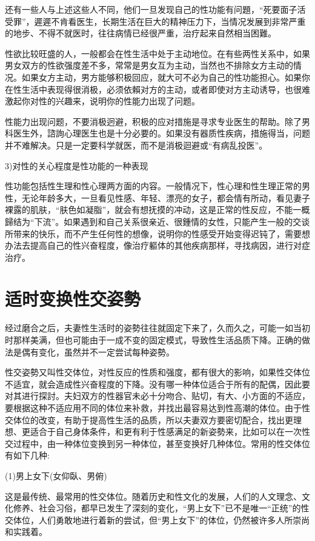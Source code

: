\documentclass[12pt,UTF8]{ctexbook}
\begin{document}
还有一些人与上述这些人不同，他们一旦发现自己的性功能有问題，“死要面子活受罪”，遲遲不肯看医生，长期生活在巨大的精神压力下，当情况发展到非常严重的地步、不得不就医时，往往病情已经很严重，治疗起来自然相当困難。

性欲比较旺盛的人，一般都会在性生活中处于主动地位。在有些两性关系中，如果男女双方的性欲强度差不多，常常是男女互为主动，当然也不排除女方主动的情况。如果女方主动，男方能够积极回应，就大可不必为自己的性功能担心。如果你在性生活中表现得很消极，必须依賴对方的主动，或者即使对方主动诱导，也很难激起你对性的兴趣来，说明你的性能力出现了问题。

性能力出现问题，不要消极迥避，积极的应对措施是寻求专业医生的帮助。除了男科医生外，諮詢心理医生也是十分必要的。如果没有器质性疾病，措施得当，问题并不难解决。只是一定要科学就医，而不是消极迴避或“有病乱投医”。

3)对性的关心程度是性功能的一种表现

性功能包括性生理和性心理两方面的内容。一般情况下，性心理和性生理正常的男性，无论年龄多大，一旦看见性感、年轻、漂亮的女子，都会情有所动，看见妻子裸露的肌肤，“肤色如凝脂”，就会有想抚摸的冲动，这是正常的性反应，不能一概歸结为“下流”。如果遇到和自己关系很亲近、很鍾情的女性，只能产生一般的交谈所带来的快乐，而不产生任何性的想像，说明你的性感受开始变得迟钝了，需要想办法去提高自己的性兴奋程度，像治疗軀体的其他疾病那样，寻找病因，进行对症治疗。

\section{适时变换性交姿勢}

经过磨合之后，夫妻性生活时的姿勢往往就固定下来了，久而久之，可能一如当初时那样美满，但也可能由于一成不变的固定模式，导致性生活品质下降。正确的做法是偶有变化，虽然并不一定尝试每种姿勢。

性交姿勢又叫性交体位，对性反应的性质和强度，都有很大的影响，如果性交体位不适宜，就会造成性兴奋程度的下降。没有哪一种体位适合于所有的配偶，因此要对其进行探討。夫妇双方的性器官未必十分吻合、贴切，有大、小方面的不适应，要根据这种不适应用不同的体位来补救，并找出最容易达到性高潮的体位。由于性交体位的改变，有助于提高性生活的品质，所以夫妻双方要密切配合，找出更理想、更适合于自己身体条件，和更有利于性感满足的新姿勢来，比如可以在一次性交过程中，由一种体位变换到另一种体位，甚至变换好几种体位。常用的性交体位有如下几种:

(1)男上女下(女仰臥、男俯)

这是最传统、最常用的性交体位。随着历史和性文化的发展，人们的人文理念、文化修养、社会习俗，都早已发生了深刻的变化，“男上女下”已不是唯一“正统”的性交体位，人们勇敢地进行着新的尝试，但“男上女下”的体位，仍然被许多人所崇尚和实践着。
\end{document}
